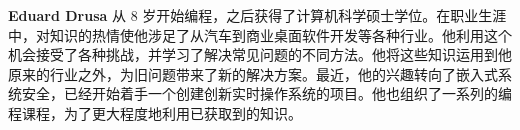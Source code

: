 \textbf{Eduard Drusa} 从 8 岁开始编程，之后获得了计算机科学硕士学位。在职业生涯中，对知识的热情使他涉足了从汽车到商业桌面软件开发等各种行业。他利用这个机会接受了各种挑战，并学习了解决常见问题的不同方法。他将这些知识运用到他原来的行业之外，为旧问题带来了新的解决方案。最近，他的兴趣转向了嵌入式系统安全，已经开始着手一个创建创新实时操作系统的项目。他也组织了一系列的编程课程，为了更大程度地利用已获取到的知识。


